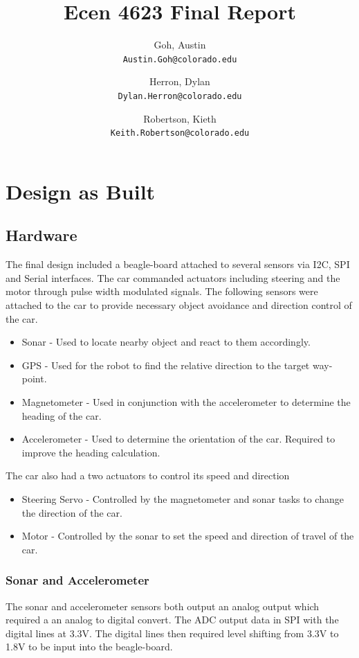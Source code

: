 \documentclass[final,letterpaper,singleside,12pt]{article}
\title{Ecen 4623 Final Report}
\author{
Goh, Austin\\
\texttt{Austin.Goh@colorado.edu}
\and
Herron, Dylan\\
\texttt{Dylan.Herron@colorado.edu}
\and
Robertson, Kieth\\
\texttt{Keith.Robertson@colorado.edu}
}
\begin{document}
\maketitle
\pagebreak
\tableofcontents
\pagebreak
\section{Design as Built} %
\label{sec:design_as_built}
\subsection{Hardware} %
\label{sub:hardware}
The final design included a beagle-board attached to several sensors via I2C, SPI and Serial interfaces. The car commanded actuators including steering and the motor through pulse width modulated signals. The following sensors were attached to the car to provide necessary object avoidance and direction control of the car.
\begin{itemize}
	\item Sonar - Used to locate nearby object and react to them accordingly.
	\item GPS - Used for the robot to find the relative direction to the target way-point.
	\item Magnetometer - Used in conjunction with the accelerometer to determine the heading of the car.
	\item Accelerometer - Used to determine the orientation of the car. Required to improve the heading calculation.
\end{itemize}
The car also had a two actuators to control its speed and direction
\begin{itemize}
	\item Steering Servo - Controlled by the magnetometer and sonar tasks to change the direction of the car.
	\item Motor - Controlled by the sonar to set the speed and direction of travel of the car.
\end{itemize}
\subsubsection{Sonar and Accelerometer} %
\label{ssub:sonar}
The sonar and accelerometer sensors both output an analog output which required a an analog to digital convert. The ADC output data in SPI with the digital lines at 3.3V. The digital lines then required level shifting from 3.3V to 1.8V to be input into the beagle-board. 
\end{document}
